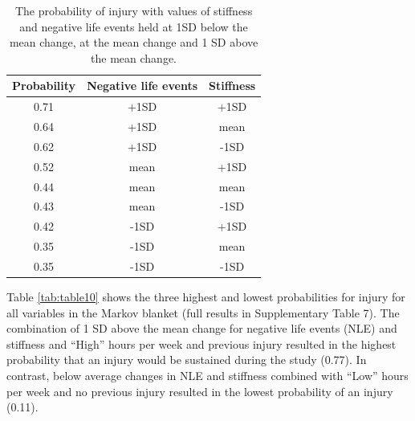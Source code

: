 \documentclass[
  english,
  man]{apa6}
\begin{document}
\begin{table}[H]

\caption{\label{tab:table9}The probability of injury with values of stiffness and negative life events held at 1SD below the mean change, at the mean change and 1 SD above the mean change.}
\centering
\begin{tabular}[t]{c|c|c}
\hline
\textbf{Probability} & \textbf{Negative life events} & \textbf{Stiffness}\\
\hline
0.71 & +1SD & +1SD\\
\hline
0.64 & +1SD & mean\\
\hline
0.62 & +1SD & -1SD\\
\hline
0.52 & mean & +1SD\\
\hline
0.44 & mean & mean\\
\hline
0.43 & mean & -1SD\\
\hline
0.42 & -1SD & +1SD\\
\hline
0.35 & -1SD & mean\\
\hline
0.35 & -1SD & -1SD\\
\hline
\end{tabular}
\end{table}

Table \ref{tab:table10} shows the three highest and lowest probabilities for injury for all variables in the Markov blanket (full results in Supplementary Table 7).
The combination of 1 SD above the mean change for negative life events (NLE) and stiffness and ``High'' hours per week and previous injury resulted in the highest probability that an injury would be sustained during the study (0.77).
In contrast, below average changes in NLE and stiffness combined with ``Low'' hours per week and no previous injury resulted in the lowest probability of an injury (0.11).
\end{document}
